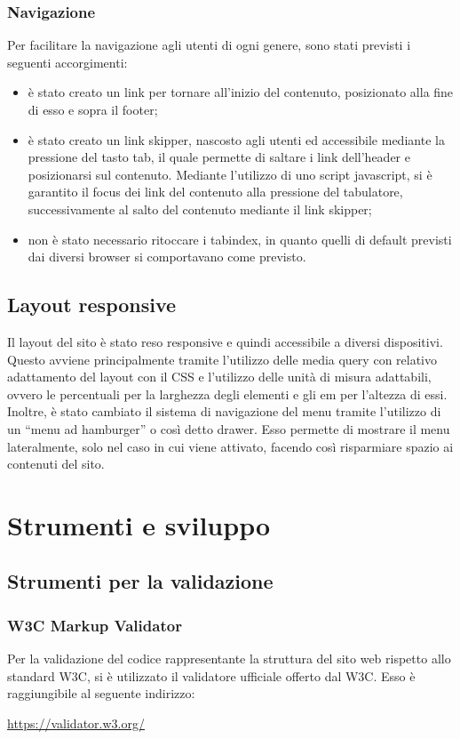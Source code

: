 		\subsubsection{Navigazione}
		Per facilitare la navigazione agli utenti di ogni genere, sono stati previsti i seguenti accorgimenti:
		\begin{itemize}
			\item è stato creato un link per tornare all'inizio del contenuto, posizionato alla fine di esso e sopra il footer;
			\item è stato creato un link skipper, nascosto agli utenti ed accessibile mediante la pressione del tasto tab, il quale permette di saltare i link dell'header e posizionarsi sul contenuto. Mediante l'utilizzo di uno script javascript, si è garantito il focus dei link del contenuto alla pressione del tabulatore, successivamente al salto del contenuto mediante il link skipper;
			\item non è stato necessario ritoccare i tabindex, in quanto quelli di default previsti dai diversi browser si comportavano come previsto.
		\end{itemize}
	\subsection{Layout responsive}
	Il layout del sito è stato reso responsive e quindi accessibile a diversi dispositivi. Questo avviene principalmente tramite l'utilizzo delle media query con relativo adattamento del layout con il CSS e l'utilizzo delle unità di misura adattabili, ovvero le percentuali per la larghezza degli elementi e gli em per l'altezza di essi. \\
	Inoltre, è stato cambiato il sistema di navigazione del menu tramite l'utilizzo di un ``menu ad hamburger'' o così detto drawer. Esso permette di mostrare il menu lateralmente, solo nel caso in cui viene attivato, facendo così risparmiare spazio ai contenuti del sito.
\section{Strumenti e sviluppo} %
	\subsection{Strumenti per la validazione}
	
		\subsubsection{W3C Markup Validator}
		Per la validazione del codice rappresentante la struttura del sito web rispetto allo standard W3C, si è utilizzato il validatore ufficiale offerto dal W3C. Esso è raggiungibile al seguente indirizzo:
		\begin{center}
			\url{https://validator.w3.org/}
		\end{center}
